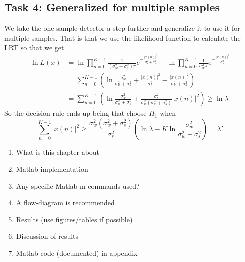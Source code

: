 \subsection{Task 4: Generalized for multiple samples}
We take the one-sample-detector a step further and generalize it to use it for multiple samples. That is that we use the likelihood function to calculate the LRT so that we get
\begin{align}
    \ln L(x) & = \ln\prod_{n=0}^{K-1}\frac{1}{(\sigma_w^2+\sigma_s^2)\pi}e^{-\frac{|x(n)|^2}{\sigma_s^2+\sigma_w^2}}-\ln\prod_{n=0}^{K-1}\frac{1}{\sigma_w^2\pi}e^{-\frac{|x(n)|^2}{\sigma_w^2}}\nonumber\\
    & = \sum_{n=0}^{K-1}\left(\ln\frac{\sigma_w^2}{\sigma_w^2+\sigma_s^2} + \frac{|x(n)|^2}{\sigma_w^2}-\frac{|x(n)|^2}{\sigma_w^2+\sigma_s^2} \right)\nonumber\\
    & = \sum_{n=0}^{K-1}\left(\ln\frac{\sigma_w^2}{\sigma_w^2+\sigma_s^2} + \frac{\sigma_s^2}{\sigma_w^2(\sigma_w^2+\sigma_s^2)}|x(n)|^2\right)\geq\ln\lambda\nonumber
\end{align}
So the decision rule ends up being that choose $H_1$ when
\begin{equation}
    \sum_{n=0}^{K-1}|x(n)|^2 \geq \frac{\sigma_w^2(\sigma_w^2+\sigma_s^2)}{\sigma_s^2}\left(\ln\lambda-K\ln\frac{\sigma_w^2}{\sigma_w^2+\sigma_s^2}\right) = \lambda'
\end{equation}
\begin{enumerate}[i]
    \item What is this chapter about
    \item Matlab implementation
    \item Any specific Matlab m-commands used?
    \item A flow-diagram is recommended
    \item Results (use figures/tables if possible)
    \item Discussion of results
    \item Matlab code (documented) in appendix
\end{enumerate}